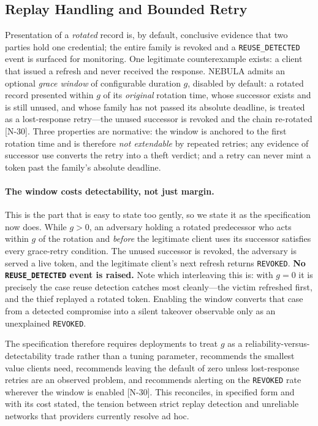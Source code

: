 \documentclass[11pt]{article}
\begin{document}
\subsection{Replay Handling and Bounded Retry}
\label{sec:reuse}

Presentation of a \textit{rotated} record is, by default, conclusive evidence
that two parties hold one credential; the entire family is revoked and a
\texttt{REUSE\_DETECTED} event is surfaced for monitoring. One legitimate
counterexample exists: a client that issued a refresh and never received the
response. NEBULA admits an optional \emph{grace window} of configurable
duration $g$, disabled by default: a rotated record presented within $g$ of
its \emph{original} rotation time, whose successor exists and is still
unused, and whose family has not passed its absolute deadline, is treated as
a lost-response retry---the unused successor is revoked and the chain
re-rotated [N-30]. Three properties are normative: the window is anchored to
the first rotation time and is therefore \emph{not extendable} by repeated
retries; any evidence of successor use converts the retry into a theft
verdict; and a retry can never mint a token past the family's absolute
deadline.

\paragraph{The window costs detectability, not just margin.} This is the part
that is easy to state too gently, so we state it as the specification now
does. While $g > 0$, an adversary holding a rotated predecessor who acts
within $g$ of the rotation and \emph{before} the legitimate client uses its
successor satisfies every grace-retry condition. The unused successor is
revoked, the adversary is served a live token, and the legitimate client's
next refresh returns \texttt{REVOKED}. \textbf{No \texttt{REUSE\_DETECTED}
event is raised.} Note which interleaving this is: with $g = 0$ it is
precisely the case reuse detection catches most cleanly---the victim
refreshed first, and the thief replayed a rotated token. Enabling the window
converts that case from a detected compromise into a silent takeover
observable only as an unexplained \texttt{REVOKED}.

The specification therefore requires deployments to treat
$g$ as a reliability-versus-detectability trade rather than a tuning
parameter, recommends the smallest value clients need, recommends leaving
the default of zero unless lost-response retries are an observed problem,
and recommends alerting on the \texttt{REVOKED} rate wherever the window is
enabled [N-30]. This reconciles, in specified form and with its cost stated,
the tension between strict replay detection and unreliable networks that
providers currently resolve ad hoc.
\end{document}
